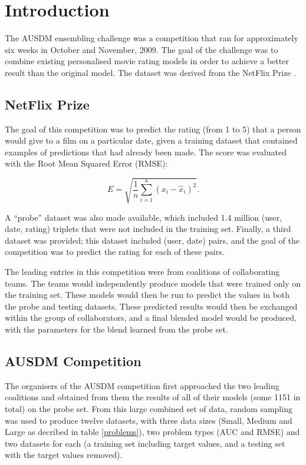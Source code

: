 \documentclass{article}
\begin{document}
\section{Introduction}

The AUSDM ensembling challenge was a competition that ran for approximately six weeks in October and November, 2009.  The goal of the challenge was to combine existing personalised movie rating models in order to achieve a better result than the original model.  The dataset was derived from the NetFlix Prize \cite{NetFlixPrize}.

\subsection{NetFlix Prize}

The goal of this competition was to predict the rating (from 1 to 5) that a person would give to a film on a particular date, given a training dataset that contained examples of predictions that had already been made.  The score was evaluated with the Root Mean Squared Error (RMSE):

\begin{equation}
E = \sqrt{\frac{1}{n} \sum_{i=1}^{n} (x_i - \hat{x}_i)^2} \label{RMSE}.
\end{equation}

A ``probe'' dataset was also made available, which included 1.4 million (user, date, rating) triplets that were not included in the training set.  Finally, a third dataset was provided; this dataset included (user, date) pairs, and the goal of the competition was to predict the rating for each of these pairs.

The leading entries in this competition were from coalitions of collaborating teams.  The teams would independently produce models that were trained only on the training set.  These models would then be run to predict the values in both the probe and testing datasets.  These predicted results would then be exchanged within the group of collaborators, and a final blended model would be produced, with the parameters for the blend learned from the probe set.

\subsection{AUSDM Competition}

The organisers of the AUSDM competition first approached the two leading coalitions and obtained from them the results of all of their models (some 1151 in total) on the probe set.  From this large combined set of data, random sampling was used to produce twelve datasets, with three data sizes (Small, Medium and Large as decribed in table \ref{problems}), two problem types (AUC and RMSE) and two datasets for each (a training set including target values, and a testing set with the target values removed).
\end{document}
